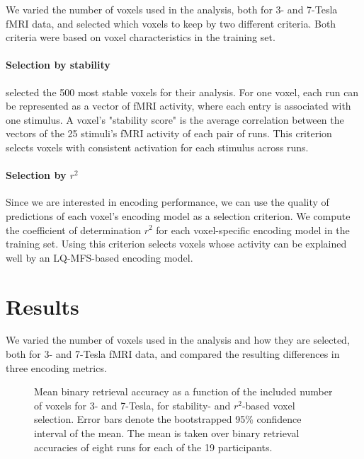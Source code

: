 We varied the number of voxels used in the analysis, both for 3- and 7-Tesla f{MRI} data,
and selected which voxels to keep by two different criteria. Both criteria were
based on voxel characteristics in the training set.  

\paragraph{Selection by stability}

\citet{ML08} selected the 500 most stable voxels for their analysis. For one
voxel, each run can be represented as a vector of f{MRI} activity, where each
entry is associated with one stimulus. A voxel's "stability score" is the average correlation between the vectors of the 25 stimuli's f{MRI} activity of each pair of runs.
This criterion selects voxels with consistent activation for each stimulus across runs.

\paragraph{Selection by $r^2$}

Since we are interested in encoding performance, we can use the quality of
predictions of each voxel's encoding model as a selection criterion. We compute
the coefficient of determination $r^2$ for each voxel-specific encoding model in
the training set. Using this criterion selects voxels whose activity can be explained well
by an LQ-MFS-based encoding model.

\section*{Results}

We varied the number of voxels used in the analysis and how they are selected,
both for 3- and 7-Tesla f{MRI} data, and compared the resulting differences in
three encoding metrics.

\begin{figure}
  \centering
  \def\svgwidth{\linewidth}
  
	
  \caption{Mean binary retrieval accuracy as a function of the included number of
  voxels for 3- and 7-Tesla, for stability- and $r^2$-based voxel selection. Error bars denote the bootstrapped 95\% confidence
  interval of the mean. The mean is taken over binary retrieval accuracies of
  eight runs for each of the 19 participants.
  }

 \label{fig:binary_retrieval}
\end{figure}

